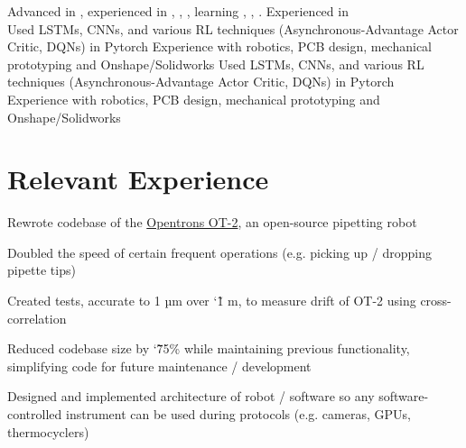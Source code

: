\documentclass[]{deedy-resume-openfont}
\begin{document}

\begin{minipage}[t]{\textwidth}
   Advanced in , experienced in , , , learning , , . Experienced in \\
  \ifdef{\software} {
     Used LSTMs, CNNs, and various RL techniques (Asynchronous-Advantage Actor Critic, DQNs) in Pytorch
  } {
    \ifdef{\robotics} {
       Experience with robotics, PCB design, mechanical prototyping and Onshape/Solidworks
    } { 
       Used LSTMs, CNNs, and various RL techniques (Asynchronous-Advantage Actor Critic, DQNs) in Pytorch \\
       Experience with robotics, PCB design, mechanical prototyping and Onshape/Solidworks
    }
  }
\end{minipage}

\vspace{12pt}

\section{Relevant Experience}

\begin{tightemize}
    \item Rewrote codebase of the \href{https://opentrons.com/ot-2/}{Opentrons OT-2}, an open-source pipetting robot
    \item Doubled the speed of certain frequent operations (e.g. picking up / dropping pipette tips)
    \item Created tests, accurate to 1 µm over \char`\~ 1 m, to measure drift of OT-2 using cross-correlation
    \item Reduced codebase size by \char`\~ 75\% while maintaining previous functionality, simplifying code for future maintenance / development
    \item Designed and implemented architecture of robot / software so any software-controlled instrument can be used during protocols (e.g. cameras, GPUs, thermocyclers)
\end{tightemize}
\end{document}
